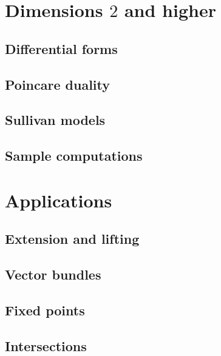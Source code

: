 \documentclass[justified]{tufte-book}
\begin{document}
  \chapter{Dimensions $2$ and higher}
    \section{Differential forms}
    \section{Poincare duality}
    \section{Sullivan models}
    \section{Sample computations}
  \chapter{Applications}
    \section{Extension and lifting}
    \section{Vector bundles}
    \section{Fixed points}
    \section{Intersections}
    
  
\end{document}
